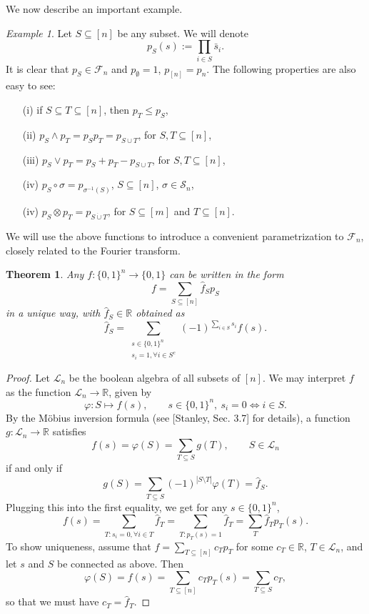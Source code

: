 \documentclass[12pt]{article}
\newtheorem{theorem}{Theorem}
\theoremstyle{definition}
\theoremstyle{remark}
\newtheorem{exm}{Example}
\def\Le{\mathcal L}
\def\Fe{\mathcal F}
\def\permut{\mathscr{S}}
\begin{document}
We now describe  an important example. 


\begin{exm}\label{ex:ps} Let $S\subseteq [n]$ be any subset. We will denote
\[
p_S(s):=\prod_{i\in S}\bar s_i.
\]
It is clear that $p_S\in \Fe_n$ and  $p_{\emptyset}=1$, $p_{[n]}=p_n$. The following
properties are also easy
to see:
\begin{enumerate}
\item[(i)] if $S\subseteq T\subseteq [n]$, then $p_T\le p_S$,
\item[(ii)]  $p_S\wedge p_T=p_Sp_T=p_{S\cup T}$, for $S,T\subseteq [n]$,
\item[(iii)]  $p_S\vee p_T=p_S+p_T-p_{S\cup T}$, for $S,T\subseteq [n]$,
\item[(iv)] $p_S\circ\sigma=p_{\sigma^{-1}(S)}$, $S\subseteq [n]$, $\sigma\in \permut_n$,
\item[(iv)] $p_S\otimes p_T=p_{S\dot{\cup} T}$, for  $S\subseteq [m]$ and $T\subseteq
[n]$.

\end{enumerate}


\end{exm}




We will use the above functions to introduce  a convenient  parametrization to $\Fe_n$,
closely related to the Fourier transform. 


\begin{theorem}\label{thm:basis} Any $f:\{0,1\}^n\to \{0,1\}$ can be written in the form 
\[
f=\sum_{S\subseteq [n]} \hat f_Sp_S
\]
in a unique way, with  $\hat f_S\in \mathbb R$ obtained as
\[
\hat f_S=\sum_{\substack{s\in \{0,1\}^n\\ s_i=1, \forall  i\in S^c}} (-1)^{\sum_{i\in
S}s_i}f(s).
\]

\end{theorem}

\begin{proof} Let $\Le_n$ be the boolean algebra of all subsets of $[n]$. We may interpret
 $f$ as the function $\Le_n\to \mathbb R$, given by
\[
\varphi: S\mapsto f(s),\qquad s\in \{0,1\}^n,\ s_i=0 \iff i\in S.
\]
By the M\"obius inversion formula (see [Stanley, Sec. 3.7] for details), a  function $g:
\Le_n\to \mathbb R$ satisfies  
\[
f(s)=\varphi(S)=\sum_{T\subseteq S} g(T),\qquad S\in \Le_n
\]
if and only if 
\[
g(S)=\sum_{T\subseteq S}(-1)^{|S\setminus T|} \varphi(T)=\hat f_S.
\]
Plugging this into the first equality, we get for any $s\in \{0,1\}^n$,
\[
f(s)=\sum_{T: s_i=0, \forall i\in T} \hat f_T=\sum_{T: p_T(s)=1}\hat f_T=\sum_T \hat
f_Tp_T(s).
\]
To show uniqueness, assume that $f=\sum_{T\subseteq [n]} c_T p_T$ for some
$c_T\in \mathbb R$, $T\in \Le_n$,  and let $s$ and $S$ be connected as above. Then 
\[
\varphi(S)=f(s)= \sum_{T\subseteq [n]} c_Tp_T(s)=\sum_{T\subseteq S} c_T,
\]
so that we must have $c_T=\hat f_T$.

\end{proof}
\end{document}
